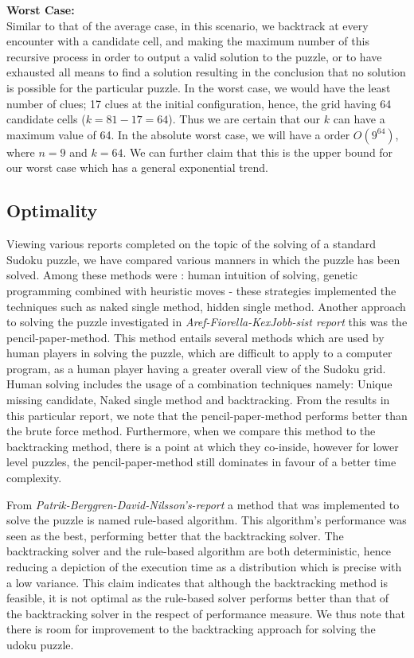 \documentclass[12pt]{article}
\begin{document}
\begin{flushleft}
\textbf{Worst Case:}\\
Similar to that of the average case, in this scenario, we backtrack at every encounter with a candidate cell, and making the maximum number of this recursive process in order to output a valid solution to the puzzle, or to have exhausted all means to find a solution resulting in the conclusion that no solution is possible for the particular puzzle. In the worst case, we would have the least number of clues; 17 clues at the initial configuration, hence, the grid having 64 candidate cells ($k = 81-17 = 64$). Thus we are certain that our $k$ can have a maximum value of 64. In the absolute worst case, we will have a order $O(9^{64})$, where $n = 9$ and $k = 64$. We can further claim that this is the upper bound for our worst case which has a general exponential trend.
\end{flushleft}
\subsection{Optimality}
\begin{flushleft}
Viewing various reports completed on the topic of the solving of a standard Sudoku puzzle, we have compared various manners in which the puzzle has been solved. 
Among these methods were : human intuition of solving, genetic programming combined with heuristic moves - these strategies implemented the techniques such as naked single method, hidden single method. 
Another approach to solving the puzzle investigated in \textsl{Aref-Fiorella-KexJobb-sist report} this  was the pencil-paper-method. This method entails several methods which are used by human players in solving the puzzle, which are difficult to apply to a computer program, as a human player having a greater overall view of the Sudoku grid. Human solving includes the usage of a combination techniques namely: Unique missing candidate, Naked single method and backtracking. From the results in this particular report, we note that the pencil-paper-method performs better than the brute force method. Furthermore, when we compare this method to the backtracking method, there is a point at which they co-inside, however for lower level puzzles, the pencil-paper-method still dominates in favour of a better time complexity. 
\end{flushleft}

\begin{flushleft}
From \textit{Patrik-Berggren-David-Nilsson's-report} a method that was implemented to solve the puzzle is named rule-based algorithm. This algorithm's performance was seen as the best, performing better that the backtracking solver. The backtracking solver and the rule-based algorithm are both deterministic, hence reducing a depiction of the execution time as a distribution which is precise with a low variance. This claim indicates that although the backtracking method is feasible, it is not optimal as the rule-based solver performs better than that of the backtracking solver in the respect of performance measure. We thus note that there is room for improvement to the backtracking approach for solving the udoku puzzle.
\end{flushleft}
\end{document}
